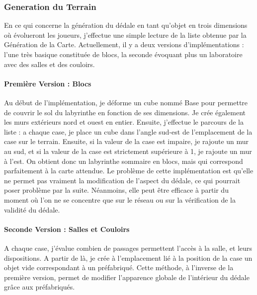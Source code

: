 \documentclass{article}
\begin{document}
\subsubsection{Generation du Terrain}
En ce qui concerne la génération du dédale en tant qu'objet en trois dimensions où évolueront les joueurs, j'effectue une simple lecture de la liste obtenue par la Génération de la Carte. Actuellement, il y a deux versions d'implémentations : l'une très basique constituée de blocs, la seconde évoquant plus un laboratoire avec des salles et des couloirs.

\paragraph{Première Version : Blocs}
Au début de l'implémentation, je déforme un cube nommé Base pour permettre de couvrir le sol du labyrinthe en fonction de ses dimensions. Je crée également les murs extérieurs nord et ouest en entier. Ensuite, j'effectue le parcours de la liste : a chaque case, je place un cube dans l'angle sud-est de l'emplacement de la case sur le terrain. Ensuite, si la valeur de la case est impaire, je rajoute un mur au sud, et si la valeur de la case est strictement supérieure à 1, je rajoute un mur à l'est. On obtient donc un labyrinthe sommaire en blocs, mais qui correspond parfaitement à la carte attendue. Le problème de cette implémentation est qu'elle ne permet pas vraiment la modification de l'aspect du dédale, ce qui pourrait poser problème par la suite. Néanmoins, elle peut être efficace à partir du moment où l'on ne se concentre que sur le réseau ou sur la vérification de la validité du dédale.

\paragraph{Seconde Version : Salles et Couloirs}
A chaque case, j'évalue combien de passages permettent l'accès à la salle, et leurs dispositions. A partir de là, je crée à l'emplacement lié à la position de la case un objet vide correspondant à un préfabriqué. Cette méthode, à l'inverse de la première version, permet de modifier l'apparence globale de l'intérieur du dédale grâce aux préfabriqués.
\end{document}
